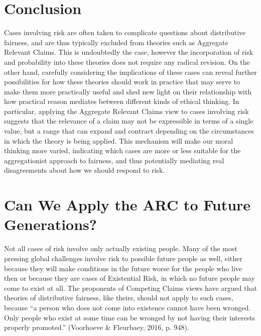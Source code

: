 \documentclass[man,11pt,a4paper]{apa7}
\begin{document}
\section{Conclusion}

Cases involving risk are often taken to complicate questions about distributive fairness, and are thus typically excluded from theories such as Aggregate Relevant Claims. This is undoubtedly the case, however the incorporation of risk and probability into these theories does not require any radical revision. On the other hand, carefully considering the implications of these cases can reveal further possibilities for how these theories should work in practice that may serve to make them more practically useful and shed new light on their relationship with how practical reason mediates between different kinds of ethical thinking. In particular, applying the Aggregate Relevant Claims view to cases involving risk suggests that the relevance of a claim may not be expressible in terms of a single value, but a range that can expand and contract depending on the circumstances in which the theory is being applied. This mechanism will make our moral thinking more varied, indicating which cases are more or less suitable for the aggregationist approach to fairness, and thus potentially mediating real disagreements about how we should respond to risk.

\appendix
\let\apaclearpage\clearpage\let\clearpage\relax
\section{Can We Apply the ARC to Future Generations?}
\let\clearpage\apaclearpage

\hspace*{\parindent}Not all cases of risk involve only actually existing people. Many of the most pressing global challenges involve risk to possible future people as well, either because they will make conditions in the future worse for the people who live then or because they are cases of Existential Risk, in which no future people may come to exist at all. The proponents of Competing Claims views have argued that theories of distributive fairness, like theirs, should not apply to such cases, because ``a person who does not come into existence cannot have been wronged. Only people who exist at some time can be wronged by not having their interests properly promoted.'' (Voorhoeve \& Fleurbaey, 2016, p. 948).
\end{document}
